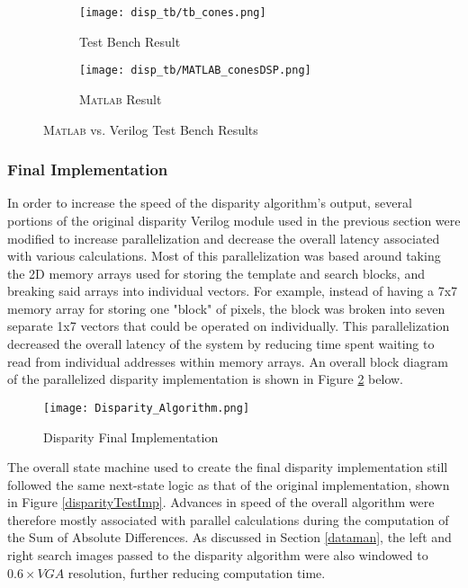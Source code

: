 \par
\begin{figure}[H] 
         \begin{subfigure}[h]{0.5\textwidth}
              \centerline{\texttt{[image: disp\_tb/tb\_cones.png]}}
             \caption{Test Bench Result}
         \end{subfigure}
         \begin{subfigure}[h]{0.5\textwidth}
             \centerline{\texttt{[image: disp\_tb/MATLAB\_conesDSP.png]}}
             \caption{\textsc{Matlab} Result}
         \end{subfigure}
\caption{\textsc{Matlab} vs. Verilog Test Bench Results}
\label{disparityVerilogvsMatlab}
\end{figure}


\subsubsection{Final Implementation}
In order to increase the speed of the disparity algorithm's output, several portions of the original disparity Verilog module used in the previous section were modified to increase parallelization and decrease the overall latency associated with various calculations. Most of this parallelization was based around taking the 2D memory arrays used for storing the template and search blocks, and breaking said arrays into individual vectors. For example, instead of having a 7x7 memory array for storing one "block" of pixels, the block was broken into seven separate 1x7 vectors that could be operated on individually. This parallelization decreased the overall latency of the system by reducing time spent waiting to read from individual addresses within memory arrays. An overall block diagram of the parallelized disparity implementation is shown in Figure \ref{disparityFinalImp} below. 
\par
\begin{figure}[H]
	\centerline{\texttt{[image: Disparity\_Algorithm.png]}}
	\caption{Disparity Final Implementation}
	\label{disparityFinalImp}
\end{figure}
\par
The overall state machine used to create the final disparity implementation still followed the same next-state logic as that of the original implementation, shown in Figure \ref{disparityTestImp}. Advances in speed of the overall algorithm were therefore mostly associated with parallel calculations during the computation of the Sum of Absolute Differences. As discussed in Section \ref{dataman}, the left and right search images passed to the disparity algorithm were also windowed to $0.6\times{}VGA$ resolution, further reducing computation time. 
